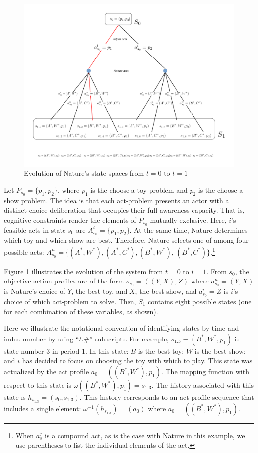 \documentclass[
11pt,
titlepage,
reqno,
]{article}%
\theoremstyle{definition}
\begin{document}
\begin{figure}[h!]
	\centering
	\includegraphics*[page=1,trim = 0in 1in 0in 0in,scale=.6]{Awareness_Diagrams_All}
	\caption{Evolution of Nature's state spaces from $t=0$ to $t=1$\label{Diag: p-01}}%
\end{figure}

Let $P_{s_0}=\{p_1,p_2\}$, where $p_1$ is the choose-a-toy problem and $p_2$ is the choose-a-show problem.
The idea is that each act-problem presents an actor with a distinct choice deliberation that occupies their full awareness capacity.
That is, cognitive constraints render the elements of $P_{s_0}$ mutually exclusive.
Here, $i$'s feasible acts in state $s_0$ are  $A^i_{s_0}=\{p_1,p_2\}$.
At the same time, Nature determines which toy and which show are best.
Therefore, Nature selects one of among four possible acts: $A^n_{s_0}=\{(A^\ast,W^\ast),(A^\ast,C^\ast),(B^\ast,W^\ast)$, $(B^\ast,C^\ast)\}$.\footnote
{
	When $a^j_s$ is a compound act, as is the case with Nature in this example, we use parentheses to list the individual elements of the act.
}

Figure \ref{Diag: p-01} illustrates the evolution of the system from $t=0$ to $t=1$. 
From $s_0$, the objective action profiles are of the form $a_{s_0}=((Y,X),Z)$ where $a^n_{s_0}=(Y,X)$ is Nature's choice of  $Y$, the best toy, and $X$, the best show, and $a^i_{s_0}=Z$ is $i$'s choice of which act-problem to solve.
Then, $S_1$ contains eight possible states (one for each combination of these variables, as shown).

Here we illustrate the notational convention of identifying states by time and index number by using ``$t.\#$'' subscripts.
For example, $s_{1.3}=(B^\ast,W^\ast,p_1)$ is state number 3 in period 1.
In this state: $B$ is the best toy; $W$ is the best show; and $i$ has decided to focus on choosing the toy with which to play.
This state was actualized by the act profile $a_0=((B^\ast,W^\ast),p_1)$.
The mapping function with respect to this state is $\omega((B^\ast,W^\ast),p_1)=s_{1.3}$.
The history associated with this state is $h_{s_{1.3}}=(s_0,s_{1.3})$.
This history corresponds to an act profile  sequence that includes a single element:  $\omega^{-1}(h_{s_{1.3}})=(a_0)$ where $a_0=((B^\ast,W^\ast),p_1)$.
	
\end{document}
